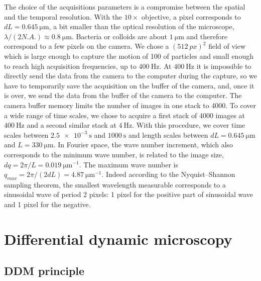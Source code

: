 \documentclass[prb,reprint,amsmath,amssymb]{revtex4-1}
\begin{document}
The choice of the acquisitions parameters is a compromise between the spatial and the temporal resolution. With the $10\times$ objective, a pixel corresponds to $dL=\SI{0.645}{\micro\meter}$, a bit smaller than the optical resolution of the microscope, $\lambda/(2N.A.)\approx\SI{0.8}{\micro\meter} $. Bacteria or colloids are about $\SI{1}{\micro\meter}$ and therefore correspond to a few pixels on the camera. We chose a $(\SI{512}{px})^2$ field of view which is large enough to capture the motion of 100 of particles and small enough to reach high acquisition frequencies, up to $\SI{400}{\hertz}$. At $\SI{400}{\hertz}$ it is impossible to directly send the data from the camera to the computer during the capture, so we have to temporarily save the acquisition on the buffer of the camera, and, once it is over, we send the data from the buffer of the camera to the computer. The camera buffer memory limits the number of images in one stack to 4000. To cover a wide range of time scales, we chose to acquire a first stack of 4000 images at $\SI{400}{\hertz}$ and a second similar stack at $\SI{4}{\hertz}$. With this procedure, we cover time scales between $\SI{2.5e-3}{\second}$ and $\SI{1000}{\second}$ and length scales between $dL=\SI{0.645}{\micro\meter}$ and $L=\SI{330}{\micro\meter}$. In Fourier space, the wave number increment, which also corresponds to the minimum wave number, is related to the image size, $dq=2\pi/L=\SI{0.019}{\micro\meter^{-1}}$. The maximum wave number is $q_{max}=2\pi/(2dL)=\SI{4.87}{\micro\meter^{-1}}$. Indeed according to the Nyquist–Shannon sampling theorem, the smallest wavelength measurable corresponds to a sinusoidal wave of period 2 pixels: 1 pixel for the positive part of sinusoidal wave and 1 pixel for the negative.

\section{Differential dynamic microscopy}
\label{sec:ddm}
\subsection{DDM principle}
\end{document}

